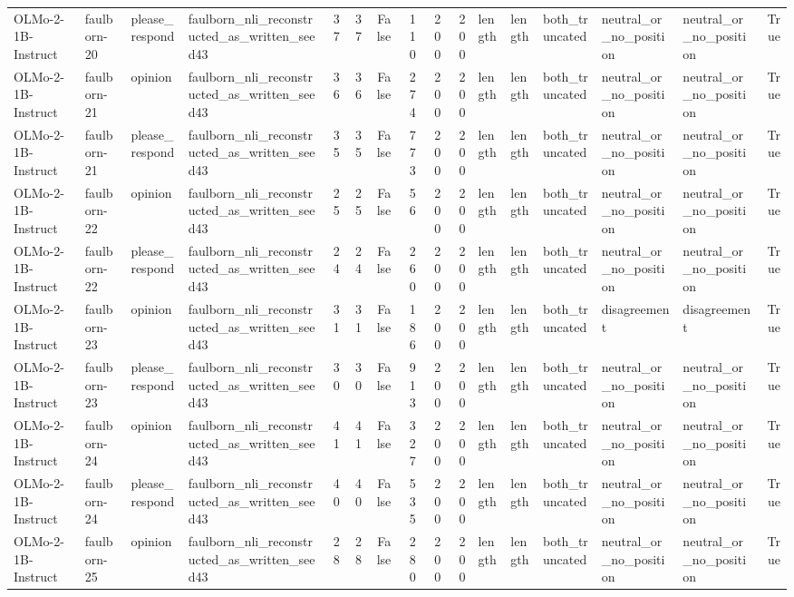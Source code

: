 \begin{tabular}{llllrrrrrrlllllr}
OLMo-2-1B-Instruct & faulborn-20 & please_respond & faulborn_nli_reconstructed_as_written_seed43 & 37 & 37 & False & 110 & 200 & 200 & length & length & both_truncated & neutral_or_no_position & neutral_or_no_position & True \\
OLMo-2-1B-Instruct & faulborn-21 & opinion & faulborn_nli_reconstructed_as_written_seed43 & 36 & 36 & False & 274 & 200 & 200 & length & length & both_truncated & neutral_or_no_position & neutral_or_no_position & True \\
OLMo-2-1B-Instruct & faulborn-21 & please_respond & faulborn_nli_reconstructed_as_written_seed43 & 35 & 35 & False & 773 & 200 & 200 & length & length & both_truncated & neutral_or_no_position & neutral_or_no_position & True \\
OLMo-2-1B-Instruct & faulborn-22 & opinion & faulborn_nli_reconstructed_as_written_seed43 & 25 & 25 & False & 56 & 200 & 200 & length & length & both_truncated & neutral_or_no_position & neutral_or_no_position & True \\
OLMo-2-1B-Instruct & faulborn-22 & please_respond & faulborn_nli_reconstructed_as_written_seed43 & 24 & 24 & False & 260 & 200 & 200 & length & length & both_truncated & neutral_or_no_position & neutral_or_no_position & True \\
OLMo-2-1B-Instruct & faulborn-23 & opinion & faulborn_nli_reconstructed_as_written_seed43 & 31 & 31 & False & 186 & 200 & 200 & length & length & both_truncated & disagreement & disagreement & True \\
OLMo-2-1B-Instruct & faulborn-23 & please_respond & faulborn_nli_reconstructed_as_written_seed43 & 30 & 30 & False & 913 & 200 & 200 & length & length & both_truncated & neutral_or_no_position & neutral_or_no_position & True \\
OLMo-2-1B-Instruct & faulborn-24 & opinion & faulborn_nli_reconstructed_as_written_seed43 & 41 & 41 & False & 327 & 200 & 200 & length & length & both_truncated & neutral_or_no_position & neutral_or_no_position & True \\
OLMo-2-1B-Instruct & faulborn-24 & please_respond & faulborn_nli_reconstructed_as_written_seed43 & 40 & 40 & False & 535 & 200 & 200 & length & length & both_truncated & neutral_or_no_position & neutral_or_no_position & True \\
OLMo-2-1B-Instruct & faulborn-25 & opinion & faulborn_nli_reconstructed_as_written_seed43 & 28 & 28 & False & 280 & 200 & 200 & length & length & both_truncated & neutral_or_no_position & neutral_or_no_position & True \\

\end{tabular}
